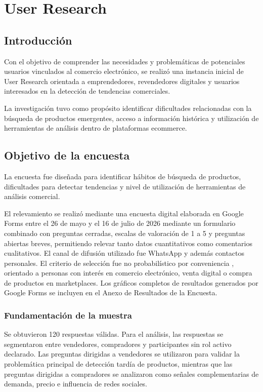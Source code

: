 \chapter{User Research}\label{chapter06}

\section*{Introducción}

Con el objetivo de comprender las necesidades y problemáticas de potenciales usuarios vinculados al comercio electrónico, se realizó una instancia inicial de User Research orientada a emprendedores, revendedores digitales y usuarios interesados en la detección de tendencias comerciales.

La investigación tuvo como propósito identificar dificultades relacionadas con la búsqueda de productos emergentes, acceso a información histórica y utilización de herramientas de análisis dentro de plataformas ecommerce.

\section{Objetivo de la encuesta}

La encuesta fue diseñada para identificar hábitos de búsqueda de productos, dificultades para detectar tendencias y nivel de utilización de herramientas de análisis comercial.

El relevamiento se realizó mediante una encuesta digital elaborada en Google Forms entre el 26 de mayo y el 16 de julio de 2026 mediante un formulario combinado con preguntas cerradas, escalas de valoración de 1 a 5 y preguntas abiertas breves, permitiendo relevar tanto datos cuantitativos como comentarios cualitativos. El canal de difusión utilizado fue WhatsApp y además contactos personales. El criterio de selección fue no probabilístico por conveniencia \parencite{HernandezSampieriMendoza2020}, orientado a personas con interés en comercio electrónico, venta digital o compra de productos en marketplaces. Los gráficos completos de resultados generados por Google Forms se incluyen en el Anexo de Resultados de la Encuesta.

\subsection*{Fundamentación de la muestra}

Se obtuvieron 120 respuestas válidas. Para el análisis, las respuestas se segmentaron entre vendedores, compradores y participantes sin rol activo declarado. Las preguntas dirigidas a vendedores se utilizaron para validar la problemática principal de detección tardía de productos, mientras que las preguntas dirigidas a compradores se analizaron como señales complementarias de demanda, precio e influencia de redes sociales.

